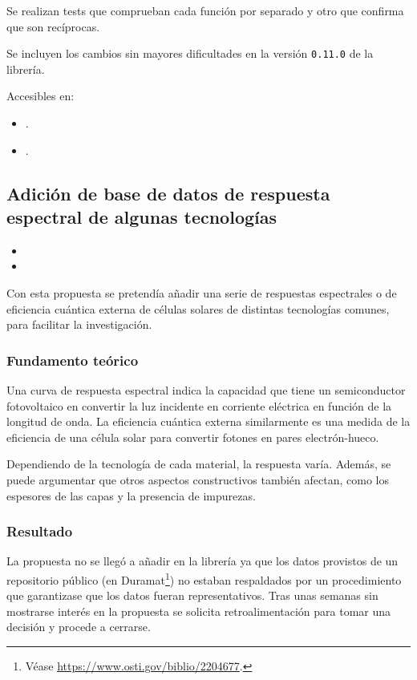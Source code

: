 Se realizan tests que comprueban cada función por separado y otro que confirma que son recíprocas.

Se incluyen los cambios sin mayores dificultades en la versión \texttt{0.11.0} de la librería.

Accesibles en:

\begin{itemize}
    \item {}.
    \item {}.
\end{itemize}

\subsection{Adición de base de datos de respuesta espectral de algunas tecnologías}

\begin{itemize}
    \item {}
    \item {}
\end{itemize}

Con esta propuesta se pretendía añadir una serie de respuestas espectrales o de \gls{eficiencia cuántica externa} de células solares de distintas tecnologías comunes, para facilitar la investigación.

\subsubsection{Fundamento teórico}

Una curva de \gls{respuesta espectral} indica la capacidad que tiene un \gls{semiconductor} fotovoltaico en convertir la luz incidente en corriente eléctrica en función de la \gls{longitud de onda}. La eficiencia cuántica externa similarmente es una medida de la eficiencia de una célula solar para convertir fotones en pares electrón-hueco.

Dependiendo de la tecnología de cada material, la respuesta varía. Además, se puede argumentar que otros aspectos constructivos también afectan, como los espesores de las capas y la presencia de impurezas.

\subsubsection{Resultado}

La propuesta no se llegó a añadir en la librería ya que los datos provistos de un repositorio público (en Duramat\footnote{Véase \url{https://www.osti.gov/biblio/2204677}.}) no estaban respaldados por un procedimiento que garantizase que los datos fueran representativos. Tras unas semanas sin mostrarse interés en la propuesta se solicita retroalimentación para tomar una decisión y procede a cerrarse.

